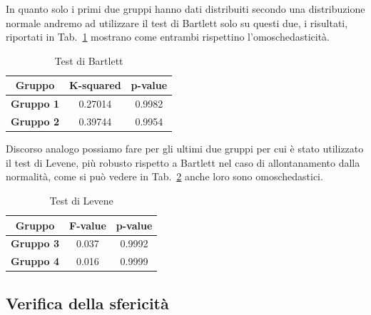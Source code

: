 \documentclass[conference]{IEEEtran}
\begin{document}
In quanto solo i primi due gruppi hanno dati distribuiti secondo una distribuzione normale
andremo ad utilizzare il test di Bartlett solo su questi due, i risultati,
riportati in Tab.~\ref{tab2} mostrano come entrambi rispettino l'omoschedasticità.
\begin{table}[htbp]
    \caption{Test di Bartlett}
    \begin{center}
    \begin{tabular}{|c|c|c|}
    \hline
    \textbf{Gruppo} & \textbf{K-squared} & \textbf{p-value} \\
    \hline
    \textbf{Gruppo 1} & 0.27014 & 0.9982 \\\cline{1-3}
    \textbf{Gruppo 2} & 0.39744 & 0.9954 \\\cline{1-3}
    \hline
    \end{tabular}
    \label{tab2}
    \end{center}
\end{table}

Discorso analogo possiamo fare per gli ultimi due gruppi per cui è stato utilizzato il test di
Levene, più robusto rispetto a Bartlett nel caso di allontanamento dalla normalità,
come si può vedere in Tab.~\ref{tab3} anche loro sono omoschedastici.
\begin{table}[htbp]
    \caption{Test di Levene}
    \begin{center}
    \begin{tabular}{|c|c|c|}
    \hline
    \textbf{Gruppo} & \textbf{F-value} & \textbf{p-value} \\
    \hline
    \textbf{Gruppo 3} & 0.037 & 0.9992 \\\cline{1-3}
    \textbf{Gruppo 4} & 0.016 & 0.9999 \\\cline{1-3}
    \hline
    \end{tabular}
    \label{tab3}
    \end{center}
\end{table}

\subsection{Verifica della sfericità}
\end{document}
